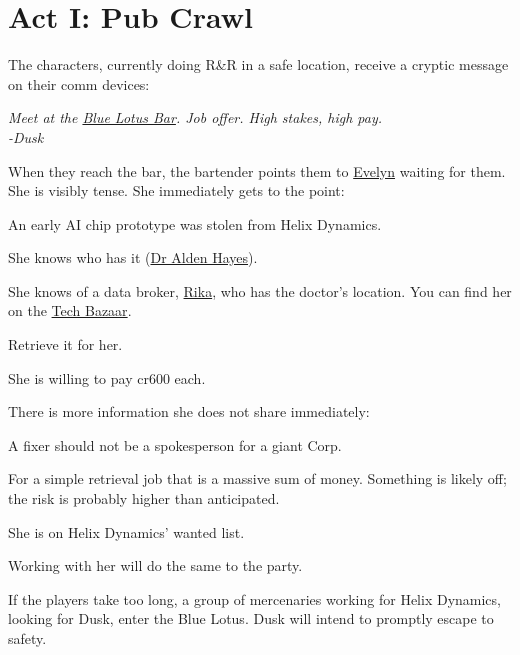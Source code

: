 \chapter{Act I: Pub Crawl} %
\label{ch:act1}
\vspace{-10mm} %
The characters, currently doing R\&R in a safe location,
receive a cryptic message on their comm devices:
\begin{exampleblock}
	\itshape
	Meet at the \hyperref[location:bar]{Blue Lotus Bar}.
	Job offer. High stakes, high pay.
	\\%
	-Dusk
\end{exampleblock}
When they reach the bar, the bartender points them to \hyperref[char:dusk]{Evelyn} waiting for them.
She is visibly tense.
She immediately gets to the point:
\begin{sitemize}
	\item An early AI chip prototype was stolen from Helix Dynamics.
	\item She knows who has it (\hyperref[char:hayes]{Dr Alden Hayes}).
	\item She knows of a data broker, \hyperref[char:rika]{Rika},
		who has the doctor's location.
		You can find her on the \hyperref[location:techbazaar]{Tech Bazaar}.
	\item Retrieve it for her.
	\item She is willing to pay cr600 each.
\end{sitemize}
\vspace{-5mm}
There is more information she does not share immediately:
\begin{sitemize}
	\item A fixer should not be a spokesperson for a giant Corp.
	\item For a simple retrieval job that is a massive sum of money.
		Something is likely off; the risk is probably higher than anticipated.
	\item She is on Helix Dynamics' wanted list.
	\item Working with her will do the same to the party.
\end{sitemize}

If the players take too long,
	a group of mercenaries working for Helix Dynamics,
	looking for Dusk,
	enter the Blue Lotus.
Dusk will intend to promptly escape to safety.
